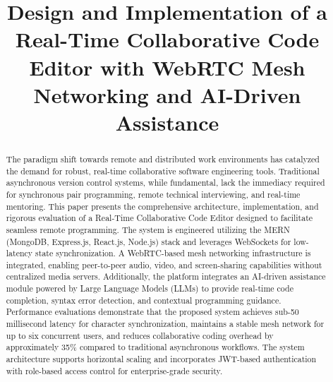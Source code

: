 \documentclass[conference]{IEEEtran}
\begin{document}
\title{Design and Implementation of a Real-Time Collaborative Code Editor with WebRTC Mesh Networking and AI-Driven Assistance\\
}

\author{
\and
{}
\and
{}
}

\maketitle

\begin{abstract}
The paradigm shift towards remote and distributed work environments has catalyzed the demand for robust, real-time collaborative software engineering tools. Traditional asynchronous version control systems, while fundamental, lack the immediacy required for synchronous pair programming, remote technical interviewing, and real-time mentoring. This paper presents the comprehensive architecture, implementation, and rigorous evaluation of a Real-Time Collaborative Code Editor designed to facilitate seamless remote programming. The system is engineered utilizing the MERN (MongoDB, Express.js, React.js, Node.js) stack and leverages WebSockets for low-latency state synchronization. A WebRTC-based mesh networking infrastructure is integrated, enabling peer-to-peer audio, video, and screen-sharing capabilities without centralized media servers. Additionally, the platform integrates an AI-driven assistance module powered by Large Language Models (LLMs) to provide real-time code completion, syntax error detection, and contextual programming guidance. Performance evaluations demonstrate that the proposed system achieves sub-50 millisecond latency for character synchronization, maintains a stable mesh network for up to six concurrent users, and reduces collaborative coding overhead by approximately 35\% compared to traditional asynchronous workflows. The system architecture supports horizontal scaling and incorporates JWT-based authentication with role-based access control for enterprise-grade security.
\end{abstract}
\end{document}
